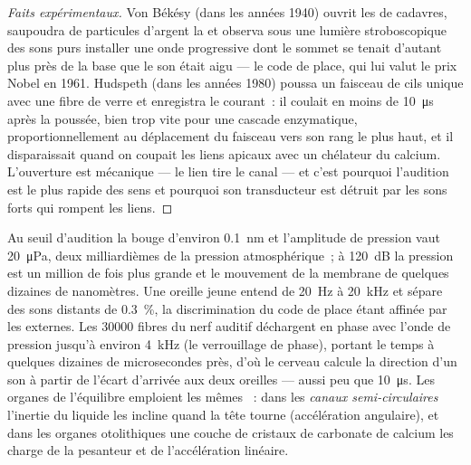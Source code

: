 \begin{proof}[Faits expérimentaux]
Von Békésy (dans les années 1940) ouvrit les  de cadavres,
saupoudra de particules d'argent la  et observa sous
une lumière stroboscopique des sons purs installer une onde progressive
dont le sommet se tenait d'autant plus près de la base que le son était
aigu --- le code de place, qui lui valut le prix Nobel en 1961.
Hudspeth (dans les années 1980) poussa un faisceau de cils unique avec
une fibre de verre et enregistra le courant~: il coulait en moins de
\qty{10}{\micro s} après la poussée, bien trop vite pour une cascade
enzymatique, proportionnellement au déplacement du faisceau vers son
rang le plus haut, et il disparaissait quand on coupait les liens
apicaux avec un chélateur du calcium. L'ouverture est mécanique --- le
lien tire le canal --- et c'est pourquoi l'audition est le plus rapide
des sens et pourquoi son transducteur est détruit par les sons forts qui
rompent les liens.
\end{proof}

\begin{example}\label{ex:b3:sensory-systems:ear-numbers}
Au seuil d'audition la  bouge d'environ \qty{0.1}{nm}
et l'amplitude de pression vaut \qty{20}{\micro Pa}, deux milliardièmes
de la pression atmosphérique~; à \qty{120}{dB} la pression est un
million de fois plus grande et le mouvement de la membrane de quelques
dizaines de nanomètres. Une oreille jeune entend de \qty{20}{Hz} à
\qty{20}{kHz} et sépare des sons distants de \qty{0.3}{\%}, la
discrimination du code de place étant affinée par les 
externes. Les \num{30000} fibres du nerf auditif déchargent en phase
avec l'onde de pression jusqu'à environ \qty{4}{kHz} (le verrouillage de
phase), portant le temps à quelques dizaines de microsecondes près, d'où
le cerveau calcule la direction d'un son à partir de l'écart d'arrivée
aux deux oreilles --- aussi peu que \qty{10}{\micro s}. Les organes de
l'équilibre emploient les mêmes ~: dans les \emph{canaux
semi-circulaires} l'inertie du liquide les incline quand la tête tourne
(accélération angulaire), et dans les organes otolithiques une couche de
cristaux de carbonate de calcium les charge de la pesanteur et de
l'accélération linéaire.
\end{example}

